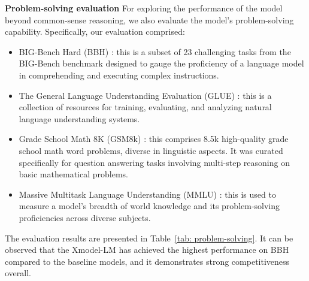 \documentclass{article}
\newcommand{\llm}{Xmodel-LM\xspace}
\begin{document}
\noindent\textbf{Problem-solving evaluation} For exploring the performance of the model beyond common-sense reasoning, we also evaluate the model's problem-solving capability. Specifically, our evaluation comprised: 
\begin{itemize}
\item BIG-Bench Hard (BBH) \citep{Suzgun2022ChallengingBT}: this is a subset of 23 challenging tasks from the BIG-Bench benchmark \citep{srivastava2023imitation} designed to gauge the proficiency of a language model in comprehending and executing complex instructions.
\item The General Language Understanding Evaluation (GLUE) \citep{wang-etal-2018-glue}: this is a collection of resources for training, evaluating, and analyzing natural language understanding systems.
\item Grade School Math 8K (GSM8k) \citep{cobbe2021gsm8k}: this comprises 8.5k high-quality grade school math word problems, diverse in linguistic aspects. It was curated specifically for question answering tasks involving multi-step reasoning on basic mathematical problems.
\item Massive Multitask Language Understanding (MMLU) \citep{hendryckstest2021}: this is used to measure a model's breadth of world knowledge and its problem-solving proficiencies across diverse subjects. 
\end{itemize}

The evaluation results are presented in Table~\ref{tab: problem-solving}. It can be observed that the \llm has achieved the highest performance on BBH compared to the baseline models, and it demonstrates strong competitiveness overall.
\end{document}
